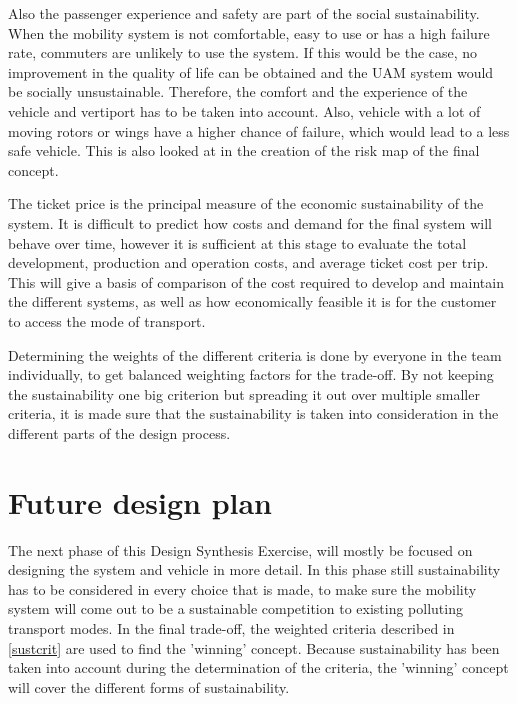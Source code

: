 Also the passenger experience and safety are part of the social sustainability. When the mobility system is not comfortable, easy to use or has a high failure rate, commuters are unlikely to use the system. If this would be the case, no improvement in the quality of life can be obtained and the UAM system would be socially unsustainable. Therefore, the comfort and the experience of the vehicle and vertiport has to be taken into account. Also, vehicle with a lot of moving rotors or wings have a higher chance of failure, which would lead to a less safe vehicle. This is also looked at in the creation of the risk map of the final concept.

The ticket price is the principal measure of the economic sustainability of the system. It is difficult to predict how costs and demand for the final system will behave over time, however it is sufficient at this stage to evaluate the total development, production and operation costs, and average ticket cost per trip. This will give a basis of comparison of the cost required to develop and maintain the different systems, as well as how economically feasible it is for the customer to access the mode of transport. 

Determining the weights of the different criteria is done by everyone in the team individually, to get balanced weighting factors for the trade-off. By not keeping the sustainability one big criterion but spreading it out over multiple smaller criteria, it is made sure that the sustainability is taken into consideration in the different parts of the design process.

\section{Future design plan}
The next phase of this Design Synthesis Exercise, will mostly be focused on designing the system and vehicle in more detail. In this phase still sustainability has to be considered in every choice that is made, to make sure the mobility system will come out to be a sustainable competition to existing polluting transport modes.  In the final trade-off, the weighted criteria described in \autoref{sustcrit} are used to find the 'winning' concept. Because sustainability has been taken into account during the determination of the criteria, the 'winning' concept will cover the different forms of sustainability.


